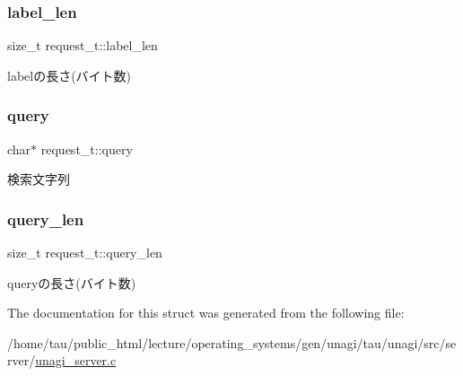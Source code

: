 \subsubsection{\texorpdfstring{label\+\_\+len}{label\_len}}
{\footnotesize\ttfamily size\+\_\+t request\+\_\+t\+::label\+\_\+len}

labelの長さ(バイト数) \mbox{\label{structrequest__t_a1edf2a25f2884e581bd011c950ee6603}} 
\subsubsection{\texorpdfstring{query}{query}}
{\footnotesize\ttfamily char$\ast$ request\+\_\+t\+::query}

検索文字列 \mbox{\label{structrequest__t_ae89af9417b7e6874716f2fe66d7112fe}} 
\subsubsection{\texorpdfstring{query\+\_\+len}{query\_len}}
{\footnotesize\ttfamily size\+\_\+t request\+\_\+t\+::query\+\_\+len}

queryの長さ(バイト数) 

The documentation for this struct was generated from the following file\+:\begin{DoxyCompactItemize}
\item 
/home/tau/public\+\_\+html/lecture/operating\+\_\+systems/gen/unagi/tau/unagi/src/server/\hyperlink{unagi__server_8c}{unagi\+\_\+server.\+c}\end{DoxyCompactItemize}
